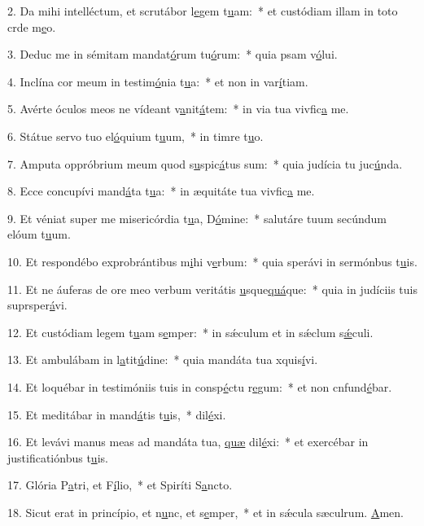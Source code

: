 2. Da mihi intelléctum, et scrutábor l\uline{e}gem t\uline{u}am:~* et custódiam illam in toto crde m\uline{e}o.\par 
3. Deduc me in sémitam mandat\uline{ó}rum tu\uline{ó}rum:~* quia psam v\uline{ó}lui.\par 
4. Inclína cor meum in testim\uline{ó}nia t\uline{u}a:~* et non in var\uline{í}tiam.\par 
5. Avérte óculos meos ne vídeant v\uline{a}nit\uline{á}tem:~* in via tua vivfic\uline{a} me.\par 
6. Státue servo tuo el\uline{ó}quium t\uline{u}um,~* in timre t\uline{u}o.\par 
7. Amputa oppróbrium meum quod s\uline{u}spic\uline{á}tus sum:~* quia judícia tu juc\uline{ú}nda.\par 
8. Ecce concupívi mand\uline{á}ta t\uline{u}a:~* in æquitáte tua vivfic\uline{a} me.\par 
9. Et véniat super me misericórdia t\uline{u}a, D\uline{ó}mine:~* salutáre tuum secúndum elóum t\uline{u}um.\par 
10. Et respondébo exprobrántibus m\uline{i}hi v\uline{e}rbum:~* quia sperávi in sermónbus t\uline{u}is.\par 
11. Et ne áuferas de ore meo verbum veritátis \uline{u}sque\uline{quá}que:~* quia in judíciis tuis suprsper\uline{á}vi.\par 
12. Et custódiam legem t\uline{u}am s\uline{e}mper:~* in sǽculum et in sǽclum s\uline{ǽ}culi.\par 
13. Et ambulábam in l\uline{a}tit\uline{ú}dine:~* quia mandáta tua xquis\uline{í}vi.\par 
14. Et loquébar in testimóniis tuis in consp\uline{é}ctu r\uline{e}gum:~* et non cnfund\uline{é}bar.\par 
15. Et meditábar in mand\uline{á}tis t\uline{u}is,~*  dil\uline{é}xi.\par 
16. Et levávi manus meas ad mandáta tua, \uline{quæ} dil\uline{é}xi:~* et exercébar in justificatiónbus t\uline{u}is.\par 
17. Glória P\uline{a}tri, et F\uline{í}lio,~* et Spiríti S\uline{a}ncto.\par 
18. Sicut erat in princípio, et n\uline{u}nc, et s\uline{e}mper,~* et in sǽcula sæculrum. \uline{A}men.\par 

